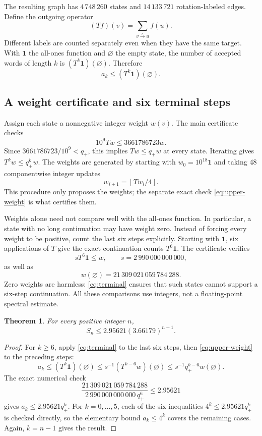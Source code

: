 \documentclass[11pt]{article}
\newtheorem{theorem}{Theorem}
\newcommand{\one}{\mathbf{1}}
\newcommand{\qplus}{q_+}
\begin{document}
The resulting graph has $4\,748\,260$ states and $14\,133\,721$
rotation-labeled edges. Define the outgoing operator
\[
 (Tf)(v)=\sum_{v\xrightarrow{r}u}f(u).
\]
Different labels are counted separately even when they have the
same target. With $\one$ the all-ones function and $\varnothing$
the empty state, the number of accepted words of length $k$ is
$(T^k\one)(\varnothing)$. Therefore
\begin{equation}\label{eq:path-upper}
 a_k\leq(T^k\one)(\varnothing).
\end{equation}

\subsection{A weight certificate and six terminal steps}

Assign each state a nonnegative integer weight $w(v)$.
The main certificate checks
\begin{equation}\label{eq:upper-weight}
 10^9Tw\leq3661786723w.
\end{equation}
Since $3661786723/10^9<\qplus$, this implies $Tw\leq\qplus w$
at every state. Iterating gives $T^kw\leq\qplus^kw$.
The weights are generated by starting with $w_0=10^{18}\one$
and taking 48 componentwise integer updates
\[
 w_{i+1}=\left\lfloor Tw_i/4\right\rfloor.
\]
This procedure only proposes the weights; the separate exact check
\eqref{eq:upper-weight} is what certifies them.

Weights alone need not compare well with the all-ones function.
In particular, a state with no long continuation may have weight
zero. Instead of forcing every weight to be positive, count the
last six steps explicitly. Starting with $\one$, six applications
of $T$ give the exact continuation counts $T^6\one$.
The certificate verifies
\begin{equation}\label{eq:terminal}
 sT^6\one\leq w,\qquad s=2\,990\,000\,000\,000,
\end{equation}
as well as
\[
 w(\varnothing)=21\,309\,021\,059\,784\,288.
\]
Zero weights are harmless: \eqref{eq:terminal} ensures that such
states cannot support a six-step continuation.
All these comparisons use integers, not a floating-point spectral
estimate.

\begin{theorem}\label{thm:upper}
For every positive integer $n$,
\[
 S_n\leq2.95621(3.66179)^{n-1}.
\]
\end{theorem}
\begin{proof}
For $k\geq6$, apply \eqref{eq:terminal} to the last six steps,
then \eqref{eq:upper-weight} to the preceding steps:
\[
 a_k\leq(T^k\one)(\varnothing)
 \leq s^{-1}(T^{k-6}w)(\varnothing)
 \leq s^{-1}\qplus^{k-6}w(\varnothing).
\]
The exact numerical check
\[
 \frac{21\,309\,021\,059\,784\,288}
 {2\,990\,000\,000\,000\,\qplus^6}\leq2.95621
\]
gives $a_k\leq2.95621\qplus^k$.
For $k=0,\ldots,5$, each of the six inequalities
$4^k\leq2.95621\qplus^k$ is checked directly, so the elementary
bound $a_k\leq4^k$ covers the remaining cases.
Again, $k=n-1$ gives the result.
\end{proof}
\end{document}
